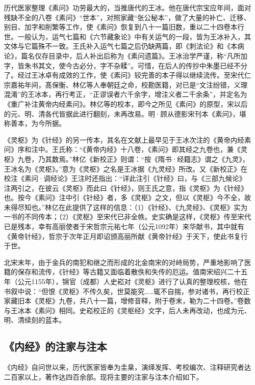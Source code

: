 \documentclass[draft,12pt]{ctexbook}
\begin{document}
历代医家整理《素问》功劳最大的，当推唐代的王冰。他在唐代宗宝应年间，面对残缺不全的八卷《素问》“世本”，对照家藏“张公秘本”，做了大量的补亡、迁移、别目、加字和削繁等工作，使《素问》恢复到八十一篇旧数，重以二十四卷本行世。一般认为，运气七篇和《六节藏象论》中有关运气的一段，皆为王冰补入，其文体与它篇殊不一致。王氏补入运气七篇之后仍缺两篇，即《刺法论》和《本病论》，篇名仅存目录中，后人补出后称为《素问遗篇》。王冰治学严谨，称“凡所加字，皆朱书其文，使今古必分，字不杂糅”。可惜，在后人的传抄中朱墨已经不分了。经过王冰卓有成效的工作，使《素问》较完善的本子得以继续流传。至宋代仁宗嘉祐年间，髙保衡、林亿等人奉朝廷之命，校勘医籍，对已是“文注纷错，义理混淆”的王冰本，再行考正，“正谬误者六千余字，增注义者二千余条”，并定名为《重广补注黄帝内经素问》。林亿等的校本，即今之所见《素问》的原型，宋以后的元、明、清各代皆据此进行翻刻，未再改易。明·顾从德影宋刊本《素问》，堪称善本，为今所据。

《灵枢》为《针经》的另一传本，其名在文献上最早见于王冰次注的《黄帝内经素问》序和注中。王氏称：“《黄帝内经》十八卷，《素问》即其经之九卷也，兼《灵枢》九卷，乃其数焉。”林亿《新校正》则谓：“按《隋书·经籍志》谓之《九灵》，王冰名为《灵枢》。”意为《灵枢》之名是王冰据《九灵经》所改。又《新校正》在校注《素问·调经论》王注时还指出：“详此注引《针经》曰，与《三部九候论》注两引之，在彼云《灵枢》而此曰《针经》，则王氏之意，指《灵枢》为《针经》也。按今《素问》注中引《针经》者，多《灵枢》之文，但以《灵枢》今不全，故未得尽知也。”林亿在此提供了这样的信息：（1）《针经》、《九灵经》、《灵枢》实为一书的不同传本；（2）《灵枢》至宋代已非全帙。史实确是这样，《灵枢》传至宋代已是残本，幸有高丽使者于宋哲宗元祐七年（公元1092年）来华献书，其中就有《黄帝针经》，哲宗于次年正月即诏颁高丽所献《黄帝针经》于天下，使此书复行于世。

北宋末年，由于金兵的南犯和继之而形成的北金南宋的对峙局势，严重地影响了医籍的保存和流传，《针经》等古籍又面临着散佚和失传的厄运。值南宋绍兴二十五年（公元1155年），锦官（成都）人史崧对《灵枢》进行了认真的整理校核，他在书叙中说：“但恨《灵枢》不传久矣，世莫能究……辄不自揣，参对诸书，再行校正家藏旧本《灵枢》九卷，共八十一篇，增修音释，附于卷末，勒为二十四卷。”卷数与王冰本《素问》相同。史崧校正的《灵枢经》文字，后人未再改动，也成为元、明、清续刻的蓝本。

\subsection{《内经》的注家与注本} %

《内经》自问世以来，历代医家皆奉为圭臬，演绎发挥、考校编次、注释研究者达二百家以上，著作达四百余部。现将主要的注家与注本介绍如下。
\end{document}
